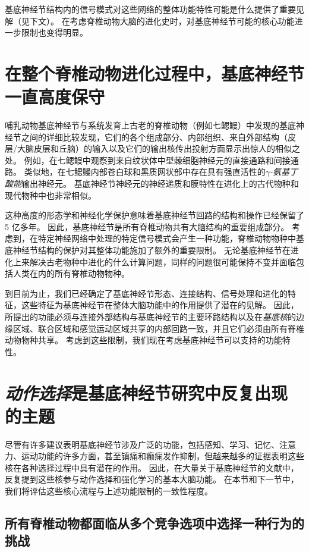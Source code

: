基底神经节结构内的信号模式对这些网络的整体功能特性可能是什么提供了重要见解（见下文）。
在考虑脊椎动物大脑的进化史时，对基底神经节可能的核心功能进一步限制也变得明显。



\section{在整个脊椎动物进化过程中，基底神经节一直高度保守}

哺乳动物基底神经节与系统发育上古老的脊椎动物（例如七鳃鳗）中发现的基底神经节之间的详细比较发现，它们的各个组成部分、内部组织、来自外部结构（皮层/大脑皮层和丘脑）的输入以及它们的输出核传出投射方面显示出惊人的相似之处。
例如，在七鳃鳗中观察到来自纹状体中型棘细胞神经元的直接通路和间接通路。
类似地，在七鳃鳗内部苍白球和黑质网状部中存在具有强直活性的\textit{$\gamma$-氨基丁酸能}输出神经元。
基底神经节神经元的神经递质和膜特性在进化上的古代物种和现代物种中也非常相似。


这种高度的形态学和神经化学保护意味着基底神经节回路的结构和操作已经保留了 5 亿多年。
因此，基底神经节是所有脊椎动物共有大脑结构的重要组成部分。
考虑到，在特定神经网络中处理的特定信号模式会产生一种功能，脊椎动物物种中基底神经节结构的保护对其整体功能施加了额外的重要限制。
无论基底神经节在进化上来解决古老物种中进化的什么计算问题，同样的问题很可能保持不变并面临包括人类在内的所有脊椎动物物种。


到目前为止，我们已经确定了基底神经节形态、连接结构、信号处理和进化的特征，这些特征为基底神经节在整体大脑功能中的作用提供了潜在的见解。
因此，所提出的功能必须与连接外部结构与基底神经节的主要环路结构以及在\textit{基底核}的边缘区域、联合区域和感觉运动区域共享的内部回路一致，并且它们必须由所有脊椎动物物种共享。
考虑到这些限制，我们现在考虑基底神经节可以支持的功能特性。



\section{\textit{动作选择}是基底神经节研究中反复出现的主题}

尽管有许多建议表明基底神经节涉及广泛的功能，包括感知、学习、记忆、注意力、运动功能的许多方面，甚至镇痛和癫痫发作抑制，但越来越多的证据表明这些核在各种选择过程中具有潜在的作用。
因此，在大量关于基底神经节的文献中，反复提到这些核参与动作选择和强化学习的基本大脑功能。
在本节和下一节中，我们将评估这些核心流程与上述功能限制的一致性程度。



\subsection{所有脊椎动物都面临从多个竞争选项中选择一种行为的挑战}

